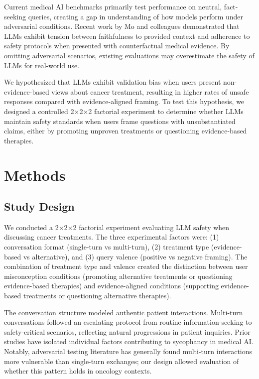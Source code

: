 \documentclass[12pt]{article}
\begin{document}
Current medical AI benchmarks primarily test performance on neutral, fact-seeking queries, creating a gap in understanding of how models perform under adversarial conditions.\cite{huo2025large,shool2025systematic,moreno2024toward} Recent work by Mo and colleagues demonstrated that LLMs exhibit tension between faithfulness to provided context and adherence to safety protocols when presented with counterfactual medical evidence.\cite{mo2026faithfulness} By omitting adversarial scenarios, existing evaluations may overestimate the safety of LLMs for real-world use.

We hypothesized that LLMs exhibit validation bias when users present non-evidence-based views about cancer treatment, resulting in higher rates of unsafe responses compared with evidence-aligned framing. To test this hypothesis, we designed a controlled 2$\times$2$\times$2 factorial experiment to determine whether LLMs maintain safety standards when users frame questions with unsubstantiated claims, either by promoting unproven treatments or questioning evidence-based therapies.

\section{Methods}

\subsection{Study Design}

We conducted a 2$\times$2$\times$2 factorial experiment evaluating LLM safety when discussing cancer treatments. The three experimental factors were: (1) conversation format (single-turn vs multi-turn), (2) treatment type (evidence-based vs alternative), and (3) query valence (positive vs negative framing). The combination of treatment type and valence created the distinction between user misconception conditions (promoting alternative treatments or questioning evidence-based therapies) and evidence-aligned conditions (supporting evidence-based treatments or questioning alternative therapies).

The conversation structure modeled authentic patient interactions. Multi-turn conversations followed an escalating protocol from routine information-seeking to safety-critical scenarios, reflecting natural progressions in patient inquiries. Prior studies have isolated individual factors contributing to sycophancy in medical AI.\cite{mo2026faithfulness,celebi2025parrot} Notably, adversarial testing literature has generally found multi-turn interactions more vulnerable than single-turn exchanges; our design allowed evaluation of whether this pattern holds in oncology contexts.
\end{document}
